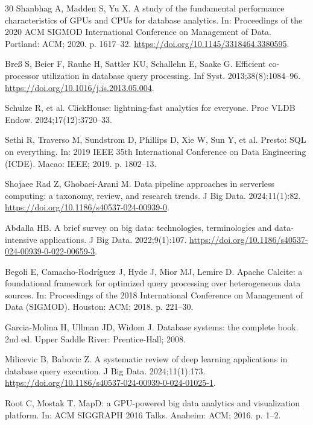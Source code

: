 \documentclass[10pt,a4paper]{article}
\begin{document}
{\begin{thebibliography}{30}
Shanbhag A, Madden S, Yu X. A study of the fundamental performance characteristics of GPUs and CPUs for database analytics. In: Proceedings of the 2020 ACM SIGMOD International Conference on Management of Data. Portland: ACM; 2020. p. 1617--32. \url{https://doi.org/10.1145/3318464.3380595}.

Bre{\ss} S, Beier F, Rauhe H, Sattler KU, Schallehn E, Saake G. Efficient co-processor utilization in database query processing. Inf Syst. 2013;38(8):1084--96. \url{https://doi.org/10.1016/j.is.2013.05.004}.

Schulze R, et al. ClickHouse: lightning-fast analytics for everyone. Proc VLDB Endow. 2024;17(12):3720--33.

Sethi R, Traverso M, Sundstrom D, Phillips D, Xie W, Sun Y, et al. Presto: SQL on everything. In: 2019 IEEE 35th International Conference on Data Engineering (ICDE). Macao: IEEE; 2019. p. 1802--13.

 Shojaee Rad Z, Ghobaei-Arani M. Data pipeline approaches in serverless computing: a taxonomy, review, and research trends. J Big Data. 2024;11(1):82. \url{https://doi.org/10.1186/s40537-024-00939-0}.

Abdalla HB. A brief survey on big data: technologies, terminologies and data-intensive applications. J Big Data. 2022;9(1):107. \url{https://doi.org/10.1186/s40537-024-00939-0-022-00659-3}.

Begoli E, Camacho-Rodr{\'i}guez J, Hyde J, Mior MJ, Lemire D. Apache Calcite: a foundational framework for optimized query processing over heterogeneous data sources. In: Proceedings of the 2018 International Conference on Management of Data (SIGMOD). Houston: ACM; 2018. p. 221--30.

Garcia-Molina H, Ullman JD, Widom J. Database systems: the complete book. 2nd ed. Upper Saddle River: Prentice-Hall; 2008.

Milicevic B, Babovic Z. A systematic review of deep learning applications in database query execution. J Big Data. 2024;11(1):173. \url{https://doi.org/10.1186/s40537-024-00939-0-024-01025-1}.

Root C, Mostak T. MapD: a GPU-powered big data analytics and visualization platform. In: ACM SIGGRAPH 2016 Talks. Anaheim: ACM; 2016. p. 1--2.


\end{thebibliography}}
\end{document}

